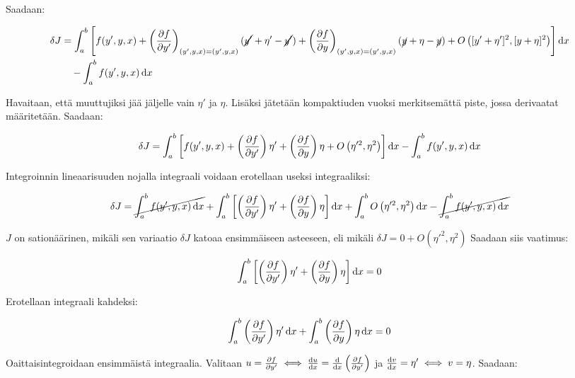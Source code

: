 \documentclass[../johdoksia.tex]{subfiles}
\begin{document}
	Saadaan:
	
	\begin{align*}
		\delta J &= \int_{a}^{b}\left[f(y', y, x) + \left(\pdv{f}{y'}\right)_{(y',y,x) = (y',y,x)}(\cancel{y'} + \eta' - \cancel{y'}) + \left(\pdv{f}{y}\right)_{(y',y,x) = (y',y,x)}(\cancel{y} + \eta - \cancel{y}) + O\left([y'+\eta']^2,[y+\eta]^2\right)\right]\odif{x} \\
		&\quad - \int_{a}^{b}f(y', y, x)\odif{x} 
	\end{align*}
	
	Havaitaan, että muuttujiksi jää jäljelle vain $\eta'$ ja $\eta$. Lisäksi jätetään kompaktiuden vuoksi merkitsemättä piste, jossa derivaatat määritetään. Saadaan:
	
	\begin{equation*}
		\delta J = \int_{a}^{b}\left[f(y', y, x) + \left(\pdv{f}{y'}\right)\eta' + \left(\pdv{f}{y}\right)\eta + O\left(\eta'^2,\eta^2\right)\right]\odif{x} - \int_{a}^{b}f(y', y, x)\odif{x}
	\end{equation*}

	Integroinnin lineaarisuuden nojalla integraali voidaan erotellaan useksi integraaliksi:
	
	\begin{equation*}
		\delta J = \cancel{\int_{a}^{b}f(y', y, x)\odif{x}} + \int_{a}^{b}\left[\left(\pdv{f}{y'}\right)\eta' + \left(\pdv{f}{y}\right)\eta\right]\odif{x} + \int_{a}^{b}O\left(\eta'^2,\eta^2\right)\odif{x} - \cancel{\int_{a}^{b}f(y', y, x)\odif{x}}
	\end{equation*}

	$J$ on sationäärinen, mikäli sen variaatio $\delta J$ katoaa ensimmäiseen asteeseen, eli mikäli $\delta J = 0 + O\left(\eta'^2,\eta^2\right)$ Saadaan siis vaatimus:
	
	\begin{equation*}
		\int_{a}^{b}\left[\left(\pdv{f}{y'}\right)\eta' + \left(\pdv{f}{y}\right)\eta\right]\odif{x} = 0
	\end{equation*}

	Erotellaan integraali kahdeksi:
	
	\begin{equation*}
		\int_{a}^{b}\left(\pdv{f}{y'}\right)\eta'\odif{x} + \int_{a}^{b}\left(\pdv{f}{y}\right)\eta\odif{x} = 0
	\end{equation*}

	Oaittaisintegroidaan ensimmäistä integraalia. Valitaan $u = \pdv{f}{y'} \iff \odv{u}{x} = \odv{}{x}\left(\pdv{f}{y'}\right)$ ja $\odv{v}{x} = \eta' \iff v = \eta$. Saadaan:
	
\end{document}
